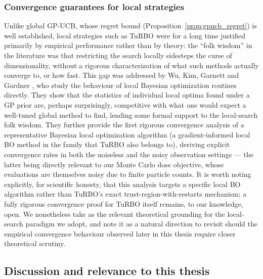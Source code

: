 \documentclass{article}
\begin{document}
	\subsubsection{Convergence guarantees for local strategies}
	
	Unlike global GP-UCB, whose regret bound (Proposition~\ref{prop:gpucb_regret}) is well established, local strategies such as TuRBO were for a long time justified primarily by empirical performance rather than by theory: the ``folk wisdom'' in the literature was that restricting the search locally sidesteps the curse of dimensionality, without a rigorous characterization of what such methods actually converge to, or how fast. This gap was addressed by Wu, Kim, Garnett and Gardner \cite{boconvergence2024}, who study the behaviour of local Bayesian optimization routines directly. They show that the statistics of individual local optima found under a GP prior are, perhaps surprisingly, competitive with what one would expect a well-tuned global method to find, lending some formal support to the local-search folk wisdom. They further provide the first rigorous convergence analysis of a representative Bayesian local optimization algorithm (a gradient-informed local BO method in the family that TuRBO also belongs to), deriving explicit convergence rates in both the noiseless and the noisy observation settings — the latter being directly relevant to our Monte Carlo dose objective, whose evaluations are themselves noisy due to finite particle counts. It is worth noting explicitly, for scientific honesty, that this analysis targets a specific local BO algorithm rather than TuRBO's exact trust-region-with-restarts mechanism; a fully rigorous convergence proof for TuRBO itself remains, to our knowledge, open. We nonetheless take \cite{boconvergence2024} as the relevant theoretical grounding for the local-search paradigm we adopt, and note it as a natural direction to revisit should the empirical convergence behaviour observed later in this thesis require closer theoretical scrutiny.
	
	\subsection{Discussion and relevance to this thesis}
	
\end{document}
